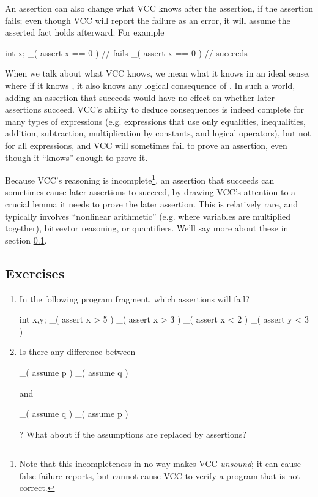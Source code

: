 An assertion can also change what VCC knows after the assertion, if
the assertion fails; even though VCC will report the failure as an error,
it will assume the asserted fact holds afterward. For example
\begin{VCC}
int x;
_( assert x == 0 ) // fails
_( assert x == 0 ) // succeeds
\end{VCC}

When we talk about what VCC knows, we mean what it knows in an ideal
sense, where if it knows , it also knows any logical
consequence of . In such a world, adding an assertion that
succeeds would have no effect on whether later assertions succeed.
VCC's ability to deduce consequences is indeed complete for many types
of expressions (e.g. expressions that use only equalities,
inequalities, addition, subtraction, multiplication by constants, and
logical operators), but not for all expressions, and VCC will
sometimes fail to prove an assertion, even though it ``knows'' enough
to prove it.  

Because VCC's reasoning is incomplete\footnote{Note that this
  incompleteness in no way makes VCC \emph{unsound}; it can cause
  false failure reports, but cannot cause VCC to verify a program that
  is not correct.}, an assertion that succeeds can sometimes cause
later assertions to succeed, by drawing VCC's attention to a crucial
lemma it needs to prove the later assertion.  This is relatively rare,
and typically involves ``nonlinear arithmetic'' (e.g. where variables
are multiplied together), bitvevtor reasoning, or quantifiers. We'll
say more about these in section \ref{}.

\subsection{Exercises}
\begin{enumerate}
\item
In the following program fragment, which assertions will fail?
\begin{VCC}
int x,y; 
_( assert x > 5 ) 
_( assert x > 3 ) 
_( assert x < 2 ) 
_( assert y < 3 )
\end{VCC}
\item
Is there any difference between 
\begin{VCC}
_( assume p ) _( assume q  )
\end{VCC}
and 
\begin{VCC}
_( assume q ) _( assume p )
\end{VCC}
? What about if the assumptions are replaced by assertions?
\end{enumerate}

